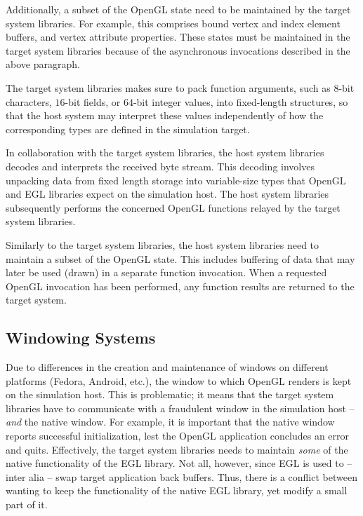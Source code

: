 Additionally, a subset of the OpenGL state need to be maintained by the target system libraries.
For example, this comprises bound vertex and index element buffers, and vertex attribute properties.
These states must be maintained in the target system libraries because of the asynchronous invocations described in the above paragraph.

The target system libraries makes sure to pack function arguments, such as $8$-bit characters, $16$-bit fields, or $64$-bit integer values, into fixed-length structures, so that the host system may interpret these values independently of how the corresponding types are defined in the simulation target.

In collaboration with the target system libraries, the host system libraries decodes and interprets the received byte stream.
This decoding involves unpacking data from fixed length storage into variable-size types that OpenGL and EGL libraries expect on the simulation host.
The host system libraries subsequently performs the concerned OpenGL functions relayed by the target system libraries.

Similarly to the target system libraries, the host system libraries need to maintain a subset of the OpenGL state.
This includes buffering of data that may later be used (drawn) in a separate function invocation.
When a requested OpenGL invocation has been performed, any function results are returned to the target system.

\subsection{Windowing Systems}
\label{sec:proposedsolutionandimplementation_windowingsystems}
Due to differences in the creation and maintenance of windows on different platforms (Fedora, Android, etc.), the window to which OpenGL renders is kept on the simulation host.
This is problematic; it means that the target system libraries have to communicate with a fraudulent window in the simulation host -- \textit{and} the native window.
For example, it is important that the native window reports successful initialization, lest the OpenGL application concludes an error and quits.
Effectively, the target system libraries needs to maintain \textit{some} of the native functionality of the EGL library.
Not all, however, since EGL is used to -- inter alia -- swap target application back buffers.
Thus, there is a conflict between wanting to keep the functionality of the native EGL library, yet modify a small part of it.

